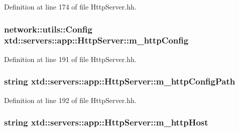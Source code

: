 Definition at line 174 of file Http\+Server.\+hh.

\subsubsection[{\texorpdfstring{m\+\_\+http\+Config}{m_httpConfig}}]{\setlength{\rightskip}{0pt plus 5cm}network\+::utils\+::\+Config xtd\+::servers\+::app\+::\+Http\+Server\+::m\+\_\+http\+Config\hspace{0.3cm}{\ttfamily [protected]}}\hypertarget{classxtd_1_1servers_1_1app_1_1HttpServer_ad5f2480d758b731b641e4858f556a3c3}{}\label{classxtd_1_1servers_1_1app_1_1HttpServer_ad5f2480d758b731b641e4858f556a3c3}


Definition at line 191 of file Http\+Server.\+hh.

\subsubsection[{\texorpdfstring{m\+\_\+http\+Config\+Path}{m_httpConfigPath}}]{\setlength{\rightskip}{0pt plus 5cm}string xtd\+::servers\+::app\+::\+Http\+Server\+::m\+\_\+http\+Config\+Path\hspace{0.3cm}{\ttfamily [protected]}}\hypertarget{classxtd_1_1servers_1_1app_1_1HttpServer_abfb9586e84fa5149da3226eeea39980f}{}\label{classxtd_1_1servers_1_1app_1_1HttpServer_abfb9586e84fa5149da3226eeea39980f}


Definition at line 192 of file Http\+Server.\+hh.

\subsubsection[{\texorpdfstring{m\+\_\+http\+Host}{m_httpHost}}]{\setlength{\rightskip}{0pt plus 5cm}string xtd\+::servers\+::app\+::\+Http\+Server\+::m\+\_\+http\+Host\hspace{0.3cm}{\ttfamily [protected]}}\hypertarget{classxtd_1_1servers_1_1app_1_1HttpServer_af1676247676379d0c12008bdcd5b7e17}{}\label{classxtd_1_1servers_1_1app_1_1HttpServer_af1676247676379d0c12008bdcd5b7e17}


